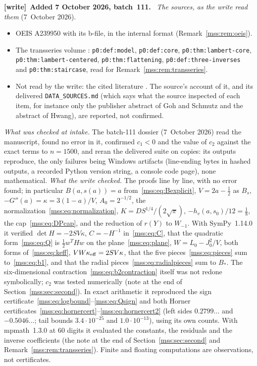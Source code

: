 \documentclass[11pt,letterpaper]{article}
\numberwithin{equation}{section}
\theoremstyle{definition}\newtheorem{definition}[theorem]{Definition}
\theoremstyle{remark}\newtheorem{remark}[theorem]{Remark}
\newcommand{\file}[1]{\nolinkurl{#1}}
\newenvironment{writenote}[1][]{\par\smallskip\begingroup\small
 \noindent\textbf{[write]}\if\relax\detokenize{#1}\relax\else~\textbf{#1.}\fi\ }%
 {\par\endgroup\smallskip}
\begin{document}
\begin{writenote}[Added 7 October 2026, batch~111]
\emph{The sources, as the write read them} (7~October 2026).
\begin{itemize}[leftmargin=*]\raggedright
\item OEIS A239950 with its b-file, in the internal format
 (Remark~\ref{mss:rem:oeis}).
\item The transseries volume
 :
 \file{p0:def:model}, \file{p0:def:core}, \file{p0:thm:lambert-core},
 \file{p0:thm:lambert-centered}, \file{p0:thm:flattening},
 \file{p0:def:three-inverses} and \file{p0:thm:staircase}, read for
 Remark~\ref{mss:rem:transseries}.
\item Not read by the write: the cited literature
 \cite{chu-vasseur,beanland-chu,chu-multisets,goh-schmutz,hwang,hwang-yeh,grabner,archibald}.
 The source's account of it, and its delivered \file{DATA_SOURCES.md} (which
 says what the source inspected of each item, for instance only the
 publisher abstract of Goh and Schmutz and the abstract of Hwang), are
 reported, not confirmed.
\end{itemize}

\emph{What was checked at intake.} The batch-111 dossier (7~October 2026)
read the manuscript, found no error in it, confirmed $c_1<0$ and the value
of $c_2$ against the exact terms to $n=1500$, and reran the delivered suite
on copies: its outputs reproduce, the only failures being Windows artifacts
(line-ending bytes in hashed outputs, a recorded Python version string, a
console code page), none mathematical. \emph{What the write checked.} The
proofs line by line, with no error found; in particular
$B(a,s(a))=a$ from~\eqref{mss:eq:Bexplicit}, $V=2a-\tfrac12$ as $B_s$,
$-G''(a)=\kappa=3(1-a)/V$, $A_0=2^{-1/2}$, the
normalization~\eqref{mss:eq:normalization}, $K=DS^{1/4}/(2\sqrt\pi)$,
$-h_v(a,s_0)/12=\tfrac18$, the cap~\eqref{mss:eq:DPcap}, and the reduction
of $r(Y)$ to $W_{-1}$. With SymPy~1.14.0 it verified $\det H=-2SV\kappa$,
$C=-H^{-1}$ in~\eqref{mss:eq:C}, that the quadratic
form~\eqref{mss:eq:Q} is $\tfrac12w^THw$ on the plane~\eqref{mss:eq:plane},
$W=L_0-J_0^2/V$, both forms of~\eqref{mss:eq:keff}, $VW\kappa_{\rm
eff}=2SV\kappa$, that the five pieces~\eqref{mss:eq:pieces}
sum to~\eqref{mss:eq:b1}, and that the radial pieces~\eqref{mss:eq:radialpieces}
sum to $B_*$. The six-dimensional contraction~\eqref{mss:eq:b2contraction}
itself was not redone symbolically; $c_2$ was tested numerically (note at the
end of Section~\ref{mss:sec:second}). In exact arithmetic it reproduced the
sign certificate~\eqref{mss:eq:logbound}--\eqref{mss:eq:Qsign} and both
Horner certificates~\eqref{mss:eq:hornercert}--\eqref{mss:eq:hornercert2}
(left sides $0.2799\ldots$ and $-0.5046\ldots$; tail bounds
$3.4\cdot10^{-25}$ and $1.0\cdot10^{-13}$), using its own counts. With
mpmath~1.3.0 at 60 digits it evaluated the constants, the residuals and the
inverse coefficients (the note at the end of Section~\ref{mss:sec:second}
and Remark~\ref{mss:rem:transseries}). Finite and floating computations are
observations, not certificates.


\end{writenote}
\end{document}
